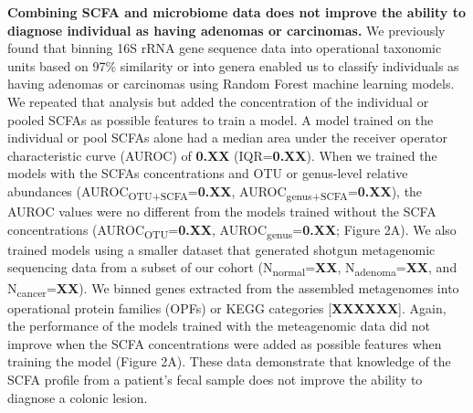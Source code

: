 \documentclass[11pt,]{article}
\begin{document}
\textbf{Combining SCFA and microbiome data does not improve the ability
to diagnose individual as having adenomas or carcinomas.} We previously
found that binning 16S rRNA gene sequence data into operational
taxonomic units based on 97\% similarity or into genera enabled us to
classify individuals as having adenomas or carcinomas using Random
Forest machine learning models. We repeated that analysis but added the
concentration of the individual or pooled SCFAs as possible features to
train a model. A model trained on the individual or pool SCFAs alone had
a median area under the receiver operator characteristic curve (AUROC)
of \textbf{0.XX} (IQR=\textbf{0.XX}). When we trained the models with
the SCFAs concentrations and OTU or genus-level relative abundances
(AUROC\textsubscript{OTU+SCFA}=\textbf{0.XX},
AUROC\textsubscript{genus+SCFA}=\textbf{0.XX}), the AUROC values were no
different from the models trained without the SCFA concentrations
(AUROC\textsubscript{OTU}=\textbf{0.XX},
AUROC\textsubscript{genus}=\textbf{0.XX}; Figure 2A). We also trained
models using a smaller dataset that generated shotgun metagenomic
sequencing data from a subset of our cohort
(N\textsubscript{normal}=\textbf{XX},
N\textsubscript{adenoma}=\textbf{XX}, and
N\textsubscript{cancer}=\textbf{XX}). We binned genes extracted from the
assembled metagenomes into operational protein families (OPFs) or KEGG
categories {[}\textbf{XXXXXX}{]}. Again, the performance of the models
trained with the meteagenomic data did not improve when the SCFA
concentrations were added as possible features when training the model
(Figure 2A). These data demonstrate that knowledge of the SCFA profile
from a patient's fecal sample does not improve the ability to diagnose a
colonic lesion.
\end{document}
